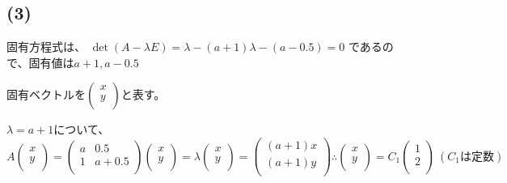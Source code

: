 \documentclass[]{jsarticle}
\begin{document}
    \subsection*{(3)}
        固有方程式は、
        $\det (A - \lambda E) = {\lambda - (a + 1)}{\lambda - (a - 0.5)} = 0$
        であるので、固有値は$a + 1, a - 0.5$

        固有ベクトルを$
        \begin{pmatrix}
            x \\
            y \\
        \end{pmatrix}
        $と表す。

        $\lambda = a + 1$について、
            \begin{equation*}
                A\begin{pmatrix}
                    x \\
                    y \\
                \end{pmatrix} =
                \begin{pmatrix}
                    a & 0.5 \\
                    1 & a + 0.5 \\
                \end{pmatrix}
                \begin{pmatrix}
                    x \\
                    y \\
                \end{pmatrix} =
                \lambda
                \begin{pmatrix}
                    x \\
                    y \\
                \end{pmatrix} =
                \begin{pmatrix}
                    (a + 1)x \\
                    (a + 1)y \\
                \end{pmatrix}
                \therefore
                \begin{pmatrix}
                    x \\
                    y \\
                \end{pmatrix} =
                C_1\begin{pmatrix}
                    1 \\
                    2 \\
                \end{pmatrix} \
                (C_1は定数)
            \end{equation*}
        
\end{document}
